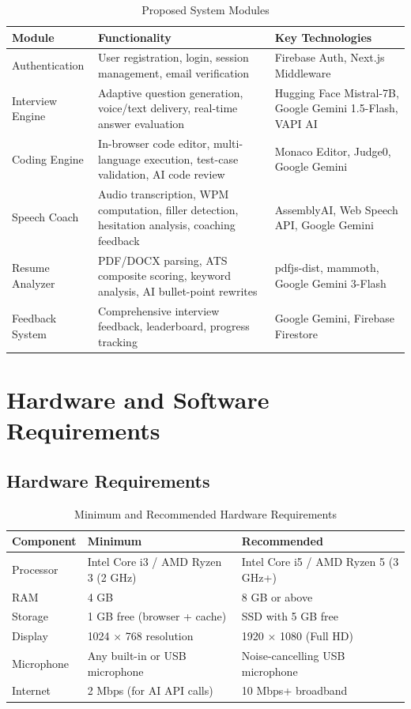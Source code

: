 \documentclass[12pt,a4paper,oneside]{report}
\begin{document}
\begin{table}[H]
\centering
\caption{Proposed System Modules}
\label{tab:modules}
\begin{tabular}{|p{3.5cm}|p{5cm}|p{5cm}|}
\hline
\textbf{Module} & \textbf{Functionality} & \textbf{Key Technologies} \\
\hline
Authentication & User registration, login, session management, email verification & Firebase Auth, Next.js Middleware \\
\hline
Interview Engine & Adaptive question generation, voice/text delivery, real-time answer evaluation & Hugging Face Mistral-7B, Google Gemini 1.5-Flash, VAPI AI \\
\hline
Coding Engine & In-browser code editor, multi-language execution, test-case validation, AI code review & Monaco Editor, Judge0, Google Gemini \\
\hline
Speech Coach & Audio transcription, WPM computation, filler detection, hesitation analysis, coaching feedback & AssemblyAI, Web Speech API, Google Gemini \\
\hline
Resume Analyzer & PDF/DOCX parsing, ATS composite scoring, keyword analysis, AI bullet-point rewrites & pdfjs-dist, mammoth, Google Gemini 3-Flash \\
\hline
Feedback System & Comprehensive interview feedback, leaderboard, progress tracking & Google Gemini, Firebase Firestore \\
\hline
\end{tabular}
\end{table}


\section{Hardware and Software Requirements}
\label{sec:hw_sw_requirements}

\subsection{Hardware Requirements}

\begin{table}[H]
\centering
\caption{Minimum and Recommended Hardware Requirements}
\label{tab:hardware}
\begin{tabular}{|p{3.5cm}|p{5cm}|p{5cm}|}
\hline
\textbf{Component} & \textbf{Minimum} & \textbf{Recommended} \\
\hline
Processor & Intel Core i3 / AMD Ryzen 3 (2 GHz) & Intel Core i5 / AMD Ryzen 5 (3 GHz+) \\
\hline
RAM & 4 GB & 8 GB or above \\
\hline
Storage & 1 GB free (browser + cache) & SSD with 5 GB free \\
\hline
Display & 1024 $\times$ 768 resolution & 1920 $\times$ 1080 (Full HD) \\
\hline
Microphone & Any built-in or USB microphone & Noise-cancelling USB microphone \\
\hline
Internet & 2 Mbps (for AI API calls) & 10 Mbps+ broadband \\
\hline
\end{tabular}
\end{table}
\end{document}
